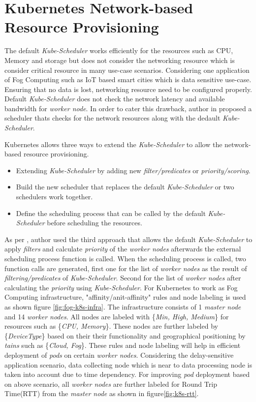 \section{Kubernetes Network-based Resource Provisioning}
\label{sec:k8s_ns}
The default \emph{Kube-Scheduler} works efficiently for the resources such as CPU, Memory and storage but does not consider the networking resource which is consider critical resource in many use-case scenarios. Considering one application of Fog Computing such as IoT based smart cities which is data sensitive use-case. Ensuring that no data is lost, networking resource need to be configured properly\cite{Santos2019}. Default \emph{Kube-Scheduler} does not check the network latency and available bandwidth for \emph{worker node}. In order to cater this drawback, author in \cite{Santos2019} proposed a scheduler thats checks for the network resources along with the dedault \emph{Kube-Scheduler}. \par
Kubernetes allows three ways to extend the \emph{Kube-Scheduler} to allow the network-based resource provisioning\cite{k8s}.
\begin{itemize}
  \item Extending \emph{Kube-Scheduler} by adding new \emph{filter/predicates} or \emph{priority/scoring}.
  \item Build the new scheduler that replaces the default \emph{Kube-Scheduler} or two schedulers work together.
  \item Define the scheduling process that can be called by the default \emph{Kube-Scheduler} before scheduling the resources.
\end{itemize}
As per \cite{Santos2019}, author used the third approach that allows the default \emph{Kube-Scheduler} to apply \emph{filters} and calculate \emph{priority} of the \emph{worker nodes} afterwards the external scheduling process function is called. When the scheduling process is called, two function calls are generated\cite{Santos2019}, first one for the list of \emph{worker nodes} as the result of \emph{filtering/predicates} of \emph{Kube-Scheduler}\cite{Santos2019}. Second for the list of \emph{worker nodes} after calculating the \emph{priority} using \emph{Kube-Scheduler}\cite{Santos2019}. For Kubernetes to work as Fog Computing infrastructure, "affinity/anit-affinity" rules and node labeling is used as shown figure \ref{fig:fog-k8s-infra}. The infrastructure consists of 1 \emph{master node} and 14 \emph{worker nodes}. All nodes are labeled with \{\emph{Min, High, Medium}\} for resources such as \{\emph{CPU, Memory}\}\cite{Santos2019}. These nodes are further labeled by \{\emph{DeviceType}\} based on their their functionality and geographical positioning by \emph{tains} such as \{\emph{Cloud, Fog}\}\cite{Santos2019}. These rules and node labeling will help in efficient deployment of \emph{pods} on certain \emph{worker nodes}. Considering the delay-sensitive application scenario, data collecting node which is near to data processing node is taken into account due to time dependency\cite{Santos2019}. For improving \emph{pod} deployment based on above scenario, all \emph{worker nodes} are further labeled for Round Trip Time(RTT) from the \emph{master node} as shown in figure\ref{fig:k8s-rtt}.\par
